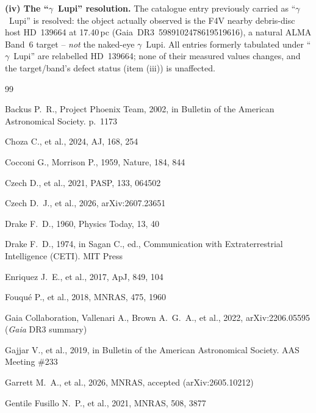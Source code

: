 \documentclass{openjournal}
\begin{document}
\textbf{(iv) The ``$\gamma$~Lupi'' resolution.} The catalogue entry
previously carried as ``$\gamma$~Lupi'' is resolved: the object
actually observed is the F4V nearby debris-disc host HD~139664 at
17.40\,pc (Gaia~DR3~5989102478619519616), a natural ALMA Band~6
target -- \emph{not} the naked-eye $\gamma$~Lupi. All entries formerly
tabulated under ``$\gamma$~Lupi'' are relabelled HD~139664; none of
their measured values changes, and the target/band's defect status
(item (iii)) is unaffected.

\clearpage
\begin{thebibliography}{99}


 Backus P.~R., Project Phoenix Team, 2002, in Bulletin of the American Astronomical Society. p.\ 1173

 Choza C., et al., 2024, AJ, 168, 254

 Cocconi G., Morrison P., 1959, Nature, 184, 844

 Czech D., et al., 2021, PASP, 133, 064502

 Czech D.~J., et al., 2026, arXiv:2607.23651

 Drake F.~D., 1960, Physics Today, 13, 40

 Drake F.~D., 1974, in Sagan C., ed., Communication with Extraterrestrial Intelligence (CETI). MIT Press



 Enriquez J.~E., et al., 2017, ApJ, 849, 104

 Fouqu\'e P., et al., 2018, MNRAS, 475, 1960

 Gaia Collaboration, Vallenari A., Brown A.~G.~A., et al., 2022, arXiv:2206.05595 ({\it Gaia} DR3 summary)

 Gajjar V., et al., 2019, in Bulletin of the American Astronomical Society. AAS Meeting \#233

 Garrett M.~A., et al., 2026, MNRAS, accepted (arXiv:2605.10212)

 Gentile Fusillo N.~P., et al., 2021, MNRAS, 508, 3877




\end{thebibliography}
\end{document}
